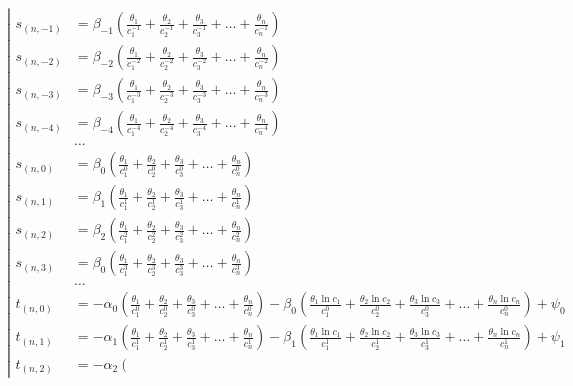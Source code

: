 %
\begin{equation*} \left| \begin{aligned}
s_{(n,-1)} &=
  \beta_{-1} \left(
  \frac{\theta_1}{c_1^{-1}}
+ \frac{\theta_2}{c_2^{-1}}
+ \frac{\theta_3}{c_3^{-1}}
+ \ldots
+ \frac{\theta_n}{c_n^{-1}} \right) \\
%
s_{(n,-2)} &=
  \beta_{-2} \left(
  \frac{\theta_1}{c_1^{-2}}
+ \frac{\theta_2}{c_2^{-2}}
+ \frac{\theta_3}{c_3^{-2}}
+ \ldots
+ \frac{\theta_n}{c_n^{-2}} \right) \\
%
s_{(n,-3)} &=
  \beta_{-3} \left(
  \frac{\theta_1}{c_1^{-3}}
+ \frac{\theta_2}{c_2^{-3}}
+ \frac{\theta_3}{c_3^{-3}}
+ \ldots
+ \frac{\theta_n}{c_n^{-3}} \right) \\
%
s_{(n,-4)} &=
  \beta_{-4} \left(
  \frac{\theta_1}{c_1^{-4}}
+ \frac{\theta_2}{c_2^{-4}}
+ \frac{\theta_3}{c_3^{-4}}
+ \ldots
+ \frac{\theta_n}{c_n^{-4}} \right) \\
%
&\ldots \\
%
s_{(n,0)} &=
  \beta_0 \left(
  \frac{\theta_1}{c_1^0}
+ \frac{\theta_2}{c_2^0}
+ \frac{\theta_3}{c_3^0}
+ \ldots
+ \frac{\theta_n}{c_n^0} \right) \\
%
s_{(n,1)} &=
  \beta_1 \left(
  \frac{\theta_1}{c_1^1}
+ \frac{\theta_2}{c_2^1}
+ \frac{\theta_3}{c_3^1}
+ \ldots
+ \frac{\theta_n}{c_n^1} \right) \\
%
s_{(n,2)} &=
  \beta_2 \left(
  \frac{\theta_1}{c_1^2}
+ \frac{\theta_2}{c_2^2}
+ \frac{\theta_3}{c_3^2}
+ \ldots
+ \frac{\theta_n}{c_n^2} \right) \\
%
s_{(n,3)} &=
  \beta_0 \left(
  \frac{\theta_1}{c_1^3}
+ \frac{\theta_2}{c_2^3}
+ \frac{\theta_3}{c_3^3}
+ \ldots
+ \frac{\theta_n}{c_n^3} \right) \\
%
&\ldots \\
%
t_{(n,0)} &=
- \alpha_0 \left(
  \frac{\theta_1}{c_1^0}
+ \frac{\theta_2}{c_2^0}
+ \frac{\theta_3}{c_3^0}
+ \ldots
+ \frac{\theta_n}{c_n^0} \right)
- \beta_0 \left(
  \frac{\theta_1 \ln{c_1}}{c_1^0}
+ \frac{\theta_2 \ln{c_2}}{c_2^0}
+ \frac{\theta_3 \ln{c_3}}{c_3^0}
+ \ldots
+ \frac{\theta_n \ln{c_n}}{c_n^0} \right)
+ \psi_0 \\
%
t_{(n,1)} &=
- \alpha_1 \left(
  \frac{\theta_1}{c_1^1}
+ \frac{\theta_2}{c_2^1}
+ \frac{\theta_3}{c_3^1}
+ \ldots
+ \frac{\theta_n}{c_n^1} \right)
- \beta_1 \left(
  \frac{\theta_1 \ln{c_1}}{c_1^1}
+ \frac{\theta_2 \ln{c_2}}{c_2^1}
+ \frac{\theta_3 \ln{c_3}}{c_3^1}
+ \ldots
+ \frac{\theta_n \ln{c_n}}{c_n^1} \right)
+ \psi_1 \\
%
t_{(n,2)} &=
- \alpha_2 \left(

\end{aligned}
\end{equation*}
